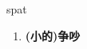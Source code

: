 
\begin{frame}
{\huge spat}
\begin{center}
\begin{enumerate}\Large
  \item \textbf{(小的)争吵}
\end{enumerate}
\end{center}
\end{frame}
